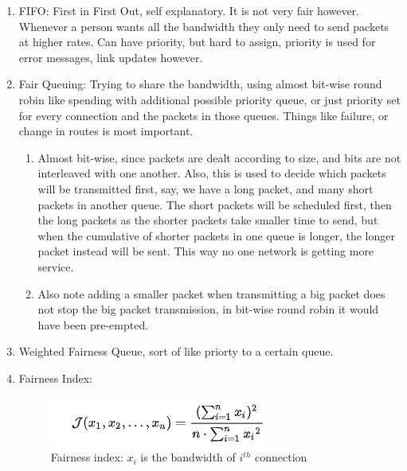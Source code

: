 \documentclass[11pt, a4paper]{article}
\begin{document}
\begin{enumerate}
    \item FIFO:
    First in First Out, self explanatory. It is not very fair however. Whenever a person wants all the bandwidth they only need to send packets at higher rates. Can have priority, but hard to assign, priority is used for error messages, link updates however.
    \item Fair Queuing:
    Trying to share the bandwidth, using almost bit-wise round robin like spending with additional possible priority queue, or just priority set for every connection and the packets in those queues. Things like failure, or change in routes is most important.
    \begin{enumerate}
        \item Almost bit-wise, since packets are dealt according to size, and bits are not interleaved with one another. Also, this is used to decide which packets will be transmitted first, say, we have a long packet, and many short packets in another queue. The short packets will be scheduled first, then the long packets as the shorter packets take smaller time to send, but when the cumulative of shorter packets in one queue is longer, the longer packet instead will be sent. This way no one network is getting more service.
        \item Also note adding a smaller packet when transmitting a big packet does not stop the big packet transmission, in bit-wise round robin it would have been pre-empted.
    \end{enumerate}
    \item Weighted Fairness Queue, sort of like priorty to a certain queue.
    \item Fairness Index:
    \begin{figure}[H]
        \centering
        \includegraphics{Pictures/fairness index.png}
        \caption{Fairness index: $x_i$ is the bandwidth of $i^{th}$ connection}
        \label{fig:Fairness Index}
    \end{figure}
\end{enumerate}
\end{document}
